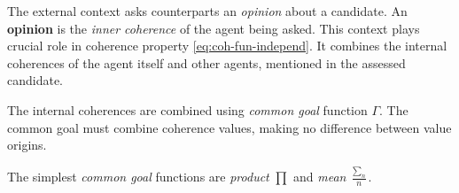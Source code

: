 \documentclass[../ThesisDoc]{subfiles}
\begin{document}
\providecommand{\rootdir}{..}

The external context asks counterparts an \emph{opinion} about a candidate.
An \textbf{opinion} is the \emph{inner coherence} of the agent being asked.
This context plays crucial role in coherence property \ref{eq:coh-fun-independ}.
It combines the internal coherences of the agent itself and other agents,
mentioned in the assessed candidate.



The internal coherences are combined using \emph{common goal} function $\Gamma$.
The common goal must combine coherence values, making no difference
between value origins.

The simplest \emph{common goal} functions are \emph{product} $\prod$
and \emph{mean} $\frac{\sum_n}{n}$.


\end{document}
